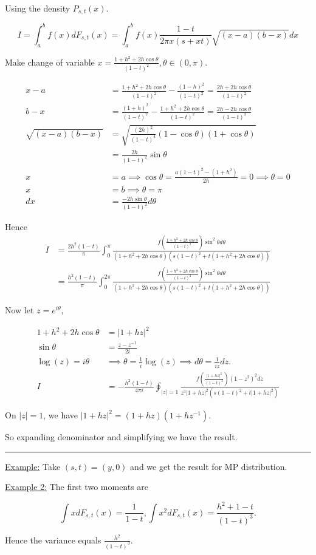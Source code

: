 \documentclass[twoside]{article}
\newenvironment{proof}{{\bf Proof:}}{\hfill\rule{2mm}{2mm}}
\begin{document}
\begin{proof}
	Using the density $P_{s,t}(x)$.
	
	$$I=\int^b_af(x)dF_{s,t}(x)=\int^b_a f(x)\frac{1-t}{2\pi x(s+xt)}\sqrt{(x-a)(b-x)}dx$$
	
	Make change of variable $x=\frac{1+h^2+2h\cos\theta}{(1-t)^2},\theta\in(0,\pi)$.
	
	\begin{equation}
		\begin{split}
			x-a &=\frac{1+h^2+2h\cos\theta}{(1-t)^2}-\frac{(1-h)^2}{(1-t)^2}=\frac{2h+2h\cos\theta}{(1-t)^2}\\
			b-x&=\frac{(1+h)^2}{(1-t)^2}-\frac{1+h^2+2h\cos\theta}{(1-t)^2}=\frac{2h-2h\cos\theta}{(1-t)^2}\\
			\sqrt{(x-a)(b-x)}&=\sqrt{\frac{(2h)^2}{(1-t)^4}(1-\cos\theta)(1+\cos\theta)}\\
			&=\frac{2h}{(1-t)^2}\sin\theta\\
			x&=a \implies \cos\theta = \frac{a(1-t)^2-(1+h^2)}{2h}=0\implies \theta =0\\
			x&=b\implies \theta =\pi \\
			dx&=\frac{-2h\sin\theta}{(1-t)^2}d\theta
		\end{split}
	\end{equation}
	
	Hence
	\begin{equation}
		\begin{split}
			I&=\frac{2h^2(1-t)}{\pi}\int^{\pi}_{0}\frac{f\left(\frac{1+h^2+2h\cos\theta}{(1-t)^2}\right)\sin^2\theta d\theta}{(1+h^2+2h\cos\theta)(s(1-t)^2+t(1+h^2+2h\cos\theta))}\\
			&=\frac{h^2(1-t)}{\pi}\int^{2\pi}_0\frac{f\left(\frac{1+h^2+2h\cos\theta}{(1-t)^2}\right)\sin^2\theta d\theta}{(1+h^2+2h\cos\theta )(s(1-t)^2+t(1+h^2+2h\cos\theta))}
		\end{split}
	\end{equation}
	
	Now let $z=e^{i\theta}$,
	
	\begin{equation}
		\begin{split}
			1+h^2+2h\cos\theta &= \lvert 1+hz\rvert^2\\
			\sin\theta &=\frac{z-z^{-1}}{2i}\\
			\log(z)=i\theta &\implies \theta =\frac{1}{i}\log(z)\implies d\theta =\frac{1}{iz}dz.\\
			I&=-\frac{h^2(1-t)}{4\pi i}\oint_{|z|=1}\frac{f\left(\frac{|1+hz|^2}{(1-t)^2}\right)(1-z^2)^2dz}{z^3|1+hz|^2(s(1-t)^2+t|1+hz|^2)}
		\end{split}
	\end{equation}
	
	On $|z|=1$, we have $|1+hz|^2=(1+hz)(1+hz^{-1})$.
	
	So expanding denominator and simplifying we have the result.
\end{proof}

\underline{Example:} Take $(s,t)=(y,0)$ and we get the result for MP distribution.

\underline{Example 2:} The first two moments are

$$\int xdF_{s,t}(x)=\frac{1}{1-t}, \int x^2dF_{s,t}(x)=\frac{h^2+1-t}{(1-t)^3}.$$

Hence the variance equals $\frac{h^2}{(1-t)^3}$.
\end{document}
